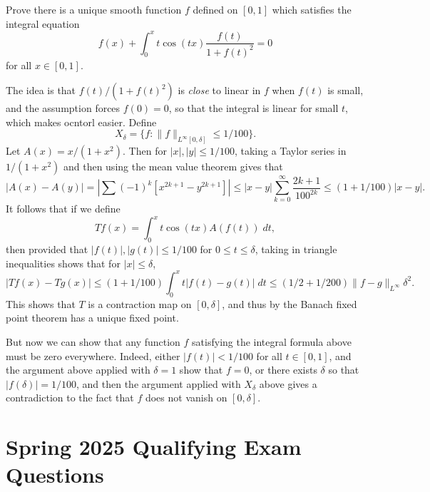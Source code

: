 \documentclass[answers]{exam}
\begin{document}
\begin{questions}
\question Prove there is a unique smooth function $f$ defined on $[0,1]$ which satisfies the integral equation
%
\[ f(x) + \int_0^x t \cos(tx) \frac{f(t)}{1 + f(t)^2} = 0 \]
%
for all $x \in [0,1]$.
\begin{solution}
	The idea is that $f(t) / (1 + f(t)^2)$ is \emph{close} to linear in $f$ when $f(t)$ is small, and the assumption forces $f(0) = 0$, so that the integral is linear for small $t$, which makes ocntorl easier. Define
	\[ X_\delta = \{ f : \| f \|_{L^\infty[0,\delta]} \leq 1/100 \}. \]
	Let $A(x) = x/(1 + x^2)$. Then for $|x|,|y| \leq 1/100$, taking a Taylor series in $1/(1 + x^2)$ and then using the mean value theorem gives that
	\[ |A(x) - A(y)| = |\sum (-1)^k [ x^{2k+1} - y^{2k + 1} ]| \leq |x - y| \sum_{k = 0}^\infty \frac{2k + 1}{100^{2k}} \leq (1 + 1/100)|x - y|. \]
	It follows that if we define
	\[ Tf(x) = \int_0^x t \cos(tx) A(f(t))\; dt, \]
	then provided that $|f(t)|, |g(t)| \leq 1/100$ for $0 \leq t \leq \delta$, taking in triangle inequalities shows that for $|x| \leq \delta$,
	\[ |Tf(x) - Tg(x)| \leq (1 + 1/100) \int_0^x t |f(t) - g(t)|\; dt \leq (1/2 + 1/200) \| f - g \|_{L^\infty} \delta^2.  \]
	This shows that $T$ is a contraction map on $[0,\delta]$, and thus by the Banach fixed point theorem has a unique fixed point.

	But now we can show that any function $f$ satisfying the integral formula above must be zero everywhere. Indeed, either $|f(t)| < 1/100$ for all $t \in [0,1]$, and the argument above applied with $\delta = 1$ show that $f = 0$, or there exists $\delta$ so that $|f(\delta)| = 1/100$, and then the argument applied with $X_\delta$ above gives a contradiction to the fact that $f$ does not vanish on $[0,\delta]$.
\end{solution}







\newpage
\section{Spring 2025 Qualifying Exam Questions}


\end{questions}
\end{document}
